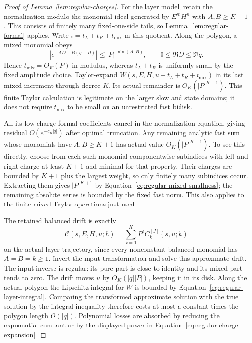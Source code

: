 \begin{proof}[Proof of Lemma~\ref{lem:regular-charges}]
For the layer model, retain the normalization modulo the monomial
ideal generated by $E^mH^n$ with $A,B\ge K+1$.  This consists of
finitely many fixed-one-side tails, so Lemma~\ref{lem:regular-formal}
applies.  Write $t=t_L+t_R+t_{\mathrm{mix}}$ in this quotient.
Along the polygon, a mixed monomial obeys
\begin{equation}\label{eq:regular-mixed-smallness}
 |e^{-AD-B(q-D)}|\le |P|^{\min(A,B)},
 \qquad 0\le\Re D\le\Re q.
\end{equation}
Hence $t_{\mathrm{mix}}=O_K(P)$ in modulus, whereas $t_L+t_R$
is uniformly small by the fixed amplitude choice.  Taylor-expand
$W(s,E,H,u+t_L+t_R+t_{\mathrm{mix}})$ in its last mixed increment
through degree $K$.  Its actual remainder is $O_K(|P|^{K+1})$.
This finite Taylor calculation is legitimate on the larger slow and
state domains; it does not require $t_{\mathrm{mix}}$ to be small on
an unrestricted fast bidisk.

All its low-charge formal coefficients cancel in the normalization
equation, giving residual $O(e^{-c_K|q|})$ after optimal truncation.
Any remaining analytic fast sum whose monomials have $A,B\ge K+1$
has actual value $O_K(|P|^{K+1})$.  To see this directly, choose from
each such monomial componentwise subindices with left and right
charge at least $K+1$ and minimal for that property.  Their charges
are bounded by $K+1$ plus the largest weight, so only finitely many
subindices occur.  Extracting them gives $|P|^{K+1}$ by
Equation~\eqref{eq:regular-mixed-smallness}; the remaining absolute series
is bounded by the fixed fast norm.  This also applies to the finite
mixed Taylor operations just used.

The retained balanced drift is exactly
\[
 \mathcal C(s,E,H,u;h)
       =\sum_{k=1}^K P^k C_k^{[J]}(s,u;h)
\]
on the actual layer trajectory, since every nonconstant balanced
monomial has $A=B=k\ge1$.  Invert the input transformation and
solve this approximate drift.  The input inverse is regular: its
pure part is close to identity and its mixed part tends to zero.
The drift moves $u$ by $O_K(|q||P|)$, keeping it in its disk.
Along the actual polygon the Lipschitz integral for $W$ is bounded
by Equation~\eqref{eq:regular-layer-integral}.  Comparing the transformed
approximate solution with the true solution by the integral
inequality therefore costs at most a constant times the polygon
length $O(|q|)$.  Polynomial losses are absorbed by reducing the
exponential constant or by the displayed power in
Equation~\eqref{eq:regular-charge-expansion}.


\end{proof}
